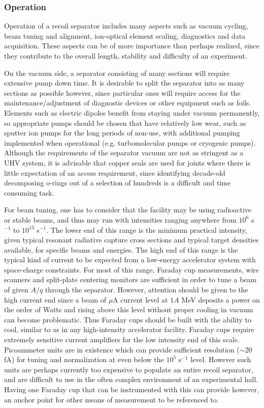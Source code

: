 \subsubsection{Operation}

Operation of a recoil separator includes many aspects such as vacuum cycling, beam tuning and alignment, ion-optical element scaling, diagnostics and data acquisition. These aspects can be of more importance than perhaps realized, since they contribute to the overall length, stability and difficulty of an experiment. 

On the vacuum side, a separator consisting of many sections will require extensive pump down time. It is desirable to split the separator into as many sections as possible however, since particular ones will require access for the maintenance/adjustment of diagnostic devices or other equipment such as foils. Elements such as electric dipoles benefit from staying under vacuum permanently, so appropriate pumps should be chosen that have relatively low wear, such as sputter ion pumps for the long periods of non-use, with additional pumping implemented when operational (e.g. turbomolecular pumps or cryogenic pumps). Although the requirements of the separator vacuum are not as stringent as a UHV system, it is advisable that copper seals are used for joints where there is little expectation of an access requirement, since identifying decade-old decomposing o-rings out of a selection of hundreds is a difficult and time consuming task.

For beam tuning, one has to consider that the facility may be using radioactive or stable beams, and thus may run with intensities ranging anywhere from $10^{6}$ s$^{-1}$ to $10^{13}$ s$^{-1}$. The lower end of this range is the minimum practical intensity, given typical resonant radiative capture cross sections and typical target densities available, for specific beams and energies. The high end of this range is the typical kind of current to be expected from a low-energy accelerator system with space-charge constraints. For most of this range, Faraday cup measurements, wire scanners and split-plate centering monitors are sufficient in order to tune a beam of given $A/q$ through the separator. However, attention should be given to the high current end since a beam of $\mu$A current level at $1A$ MeV deposits a power on the order of Watts and rising above this level without proper cooling in vacuum can become problematic. Thus Faraday cups should be built with the ability to cool, similar to as in any high-intensity accelerator facility. Faraday cups require extremely sensitive current amplifiers for the low intensity end of this scale. Picoammeter units are in existence which can provide sufficient resolution ($\sim$20 fA) for tuning and normalization at even below the $10^{5}$ s$^{-1}$ level. However such units are perhaps currently too expensive to populate an entire recoil separator, and are difficult to use in the often complex environment of an experimental hall. Having one Faraday cup that can be instrumented with this can provide however, an anchor point for other means of measurement to be referenced to. 

